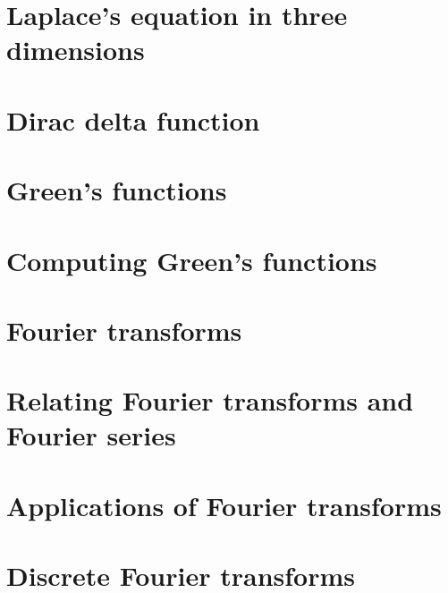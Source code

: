 \documentclass{article}
\begin{document}
\section{Laplace's equation in three dimensions}

\section{Dirac delta function}

\section{Green's functions}

\section{Computing Green's functions}

\section{Fourier transforms}

\section{Relating Fourier transforms and Fourier series}

\section{Applications of Fourier transforms}

\section{Discrete Fourier transforms}

\end{document}
